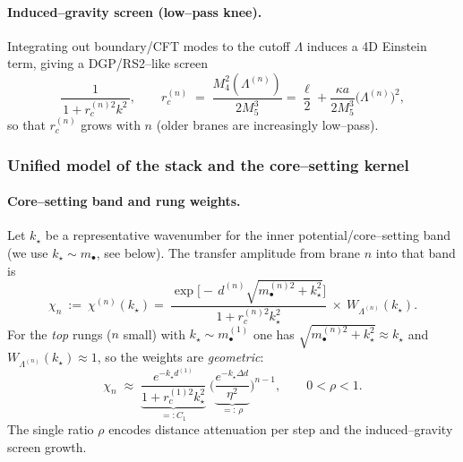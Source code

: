 \documentclass[10pt]{article}
\theoremstyle{definition}
\theoremstyle{plain}
\begin{document}
\paragraph{Induced–gravity screen (low–pass knee).}\label{par:uom-main-182}
Integrating out boundary/CFT modes to the cutoff $\Lambda$ induces a 4D Einstein term, giving a DGP/RS2–like screen
\begin{equation}
\frac{1}{\,1+r_c^{(n)2} k^2\,},\qquad 
r_c^{(n)}\;=\;\frac{M_4^2(\Lambda^{(n)})}{2M_5^3}
=\frac{\ell}{2}+\frac{\kappa a}{2M_5^3}\big(\Lambda^{(n)}\big)^2,
\label{eq:screen}
\end{equation}
so that $r_c^{(n)}$ grows with $n$ (older branes are increasingly low–pass).

\subsubsection*{Unified model of the stack and the core–setting kernel}
\label{subsubsec:unified-model}

\paragraph{Core–setting band and rung weights.}\label{par:uom-main-183}
Let $k_\star$ be a representative wavenumber for the inner potential/core–setting band (we use $k_\star\sim m_\bullet$, see below). The transfer amplitude from brane $n$ into that band is
\begin{equation}
\chi_n\ :=\ \chi^{(n)}(k_\star)
=\ \frac{\exp\!\big[-\,d^{(n)}\sqrt{m_\bullet^{(n)2}+k_\star^2}\big]}{\,1+r_c^{(n)2}k_\star^2\,}\ \times\ W_{\Lambda^{(n)}}(k_\star).
\label{eq:chi-def}
\end{equation}
For the \emph{top} rungs ($n$ small) with $k_\star\sim m_\bullet^{(1)}$ one has $\sqrt{m_\bullet^{(n)2}+k_\star^2}\approx k_\star$ and $W_{\Lambda^{(n)}}(k_\star)\approx 1$, so the weights are \emph{geometric}:
\begin{equation}
\chi_n\;\approx\; \underbrace{\frac{e^{-k_\star d^{(1)}}}{1+r_c^{(1)2}k_\star^2}}_{=:C_1}\;
\Big(\underbrace{\frac{e^{-k_\star \Delta d}}{\eta^2}}_{=:\,\rho}\Big)^{n-1},
\qquad 0<\rho<1.
\label{eq:chi-geo}
\end{equation}
The single ratio $\rho$ encodes distance attenuation per step and the induced--gravity screen growth.
\end{document}
